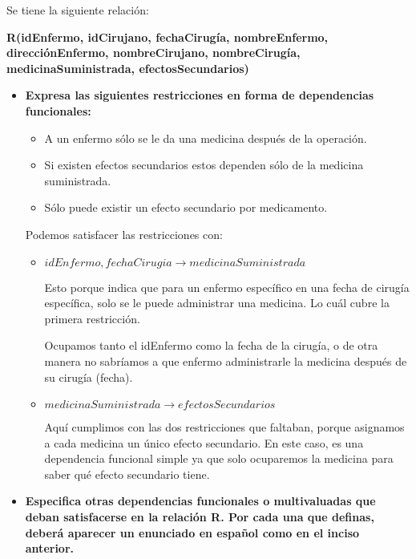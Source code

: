 Se tiene la siguiente relación:
\begin{center}
    \textbf{R(idEnfermo, idCirujano, fechaCirugía, nombreEnfermo, direcciónEnfermo, nombreCirujano, nombreCirugía, medicinaSuministrada, efectosSecundarios)}
\end{center}
\begin{itemize}
    \item \textbf{Expresa las siguientes restricciones en forma de dependencias funcionales:}
    
    \begin{itemize}
        \item A un enfermo sólo se le da una medicina después de la operación. 
        \item Si existen efectos secundarios estos dependen sólo de la medicina suministrada.
        \item Sólo puede existir un efecto secundario por medicamento.
    \end{itemize}

    Podemos satisfacer las restricciones con:
    \begin{itemize}
        \item $idEnfermo, fechaCirugia \rightarrow medicinaSuministrada$

        Esto porque indica que para un enfermo específico en una fecha de cirugía específica, solo se le puede administrar una medicina. Lo cuál cubre la primera restricción. 

        Ocupamos tanto el idEnfermo como la fecha de la cirugía, o de otra manera no sabríamos a que enfermo administrarle la medicina después de su cirugía (fecha).

        \item $medicinaSuministrada \rightarrow efectosSecundarios$

        Aquí cumplimos con las dos restricciones que faltaban, porque asignamos a cada medicina un único efecto secundario. En este caso, es una dependencia funcional simple ya que solo ocuparemos la medicina para saber qué efecto secundario tiene. 
    \end{itemize}
    
    \item \textbf{Especifica otras dependencias funcionales o multivaluadas que deban satisfacerse en la relación \textbf{R}. Por cada una que definas, deberá aparecer un enunciado en español como en el inciso anterior.}


\end{itemize}
